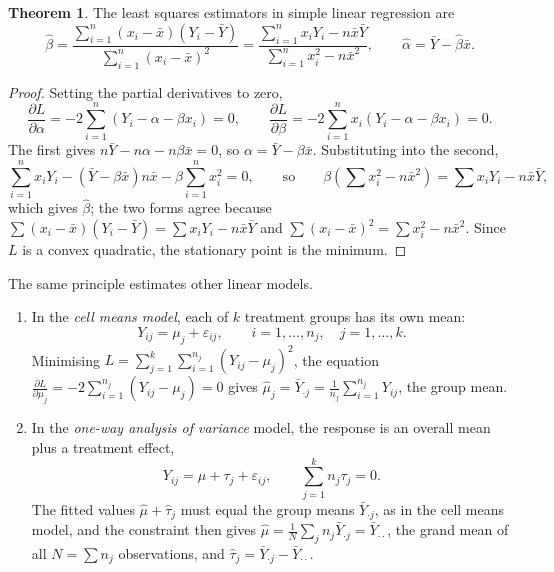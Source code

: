 \documentclass[12pt,a4paper]{report}
\theoremstyle{definition}
\newtheorem{thm}{Theorem}[section]
\theoremstyle{plain}
\begin{document}
\begin{thm}
\label{thm:lse}
The least squares estimators in simple linear regression are
\[\hat{\beta} = \frac{\sum^n_{i = 1}(x_i - \bar{x})(Y_i - \bar{Y})}{\sum^n_{i =
1}(x_i - \bar{x})^2} = \frac{\sum^n_{i = 1} x_iY_i - n\bar{x}\bar{Y}}{\sum^n_{i
= 1} x^2_i - n\bar{x}^2},\qquad \hat\alpha = \bar Y - \hat\beta\bar x .\]
\end{thm}

\begin{proof}
Setting the partial derivatives to zero,
\[\frac{\partial L}{\partial \alpha} = -2\sum^n_{i=1}(Y_i - \alpha - \beta x_i) =
0,\qquad \frac{\partial L}{\partial \beta} = -2\sum^n_{i=1}x_i(Y_i - \alpha -
\beta x_i) = 0 .\]
The first gives $n\bar{Y} - n\alpha - n\beta \bar{x} = 0$, so
$\alpha = \bar{Y} - \beta\bar{x}$. Substituting into the second,
\[\sum^n_{i=1}x_iY_i - \left(\bar{Y} - \beta \bar{x}\right)n\bar{x} - \beta
\sum^n_{i = 1} x^2_i = 0,\qquad\text{so}\qquad \beta\left(\sum x_i^2 - n\bar
x^2\right) = \sum x_iY_i - n\bar x\bar Y ,\]
which gives $\hat\beta$; the two forms agree because $\sum(x_i - \bar x)(Y_i -
\bar Y) = \sum x_iY_i - n\bar x\bar Y$ and $\sum(x_i - \bar x)^2 = \sum x_i^2 -
n\bar x^2$. Since $L$ is a convex quadratic, the stationary point is the
minimum.
\end{proof}

The same principle estimates other linear models.
\begin{enumerate}
\item In the \emph{cell means model}, each of $k$ treatment groups has its own
mean:
\[Y_{ij} = \mu_{j} + \varepsilon_{ij},\qquad i = 1,\dots ,n_j,\quad j =
1,\dots,k .\]
Minimising $L = \sum_{j=1}^k\sum_{i=1}^{n_j}(Y_{ij} - \mu_{j})^2$, the equation
$\frac{\partial L}{\partial \mu_j} = -2\sum_{i=1}^{n_j}(Y_{ij} - \mu_j) = 0$
gives $\hat{\mu}_j = \bar{Y}_{\cdot j} = \frac{1}{n_j}\sum_{i=1}^{n_j}Y_{ij}$, the
group mean.

\item In the \emph{one-way analysis of variance} model, the response is an
overall mean plus a treatment effect,
\[Y_{ij} = \mu + \tau_j + \varepsilon_{ij},\qquad \sum^k_{j=1}n_j\tau_j = 0 .\]
The fitted values $\hat\mu + \hat\tau_j$ must equal the group means
$\bar Y_{\cdot j}$, as in the cell means model, and the constraint then gives
$\hat\mu = \frac{1}{N}\sum_j n_j\bar Y_{\cdot j} = \bar Y_{\cdot\cdot}$, the
grand mean of all $N = \sum n_j$ observations, and
$\hat\tau_j = \bar{Y}_{\cdot j} - \bar{Y}_{\cdot\cdot}$.
\end{enumerate}
\end{document}
